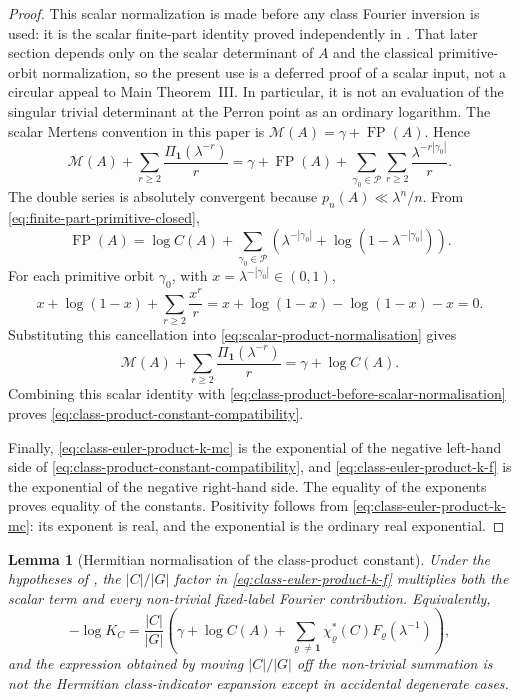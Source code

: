 \documentclass[11pt,a4paper]{amsart}
\theoremstyle{plain}
\newtheorem{lemma}[theorem]{Lemma}
\theoremstyle{definition}
\theoremstyle{remark}
\DeclareMathOperator{\FP}{FP}
\newcommand{\cP}{\mathcal P}
\begin{document}
\begin{proof}
  This scalar normalization is made before any class Fourier inversion is
  used: it is the scalar finite-part identity proved independently in
  .  That later section depends only on the scalar
  determinant of \(A\) and the classical primitive-orbit normalization, so the
  present use is a deferred proof of a scalar input, not a circular appeal to
  Main Theorem~III.  In particular, it is not an evaluation of the singular
  trivial determinant at the Perron point as an ordinary logarithm.
  The scalar Mertens convention in this paper is
  \(\mathcal M(A)=\gamma+\FP(A)\). Hence
  \begin{equation}\label{eq:scalar-product-normalisation}
    \mathcal M(A)+\sum_{r\ge2}\frac{\Pi_{\mathbf1}(\lambda^{-r})}{r}
    =
    \gamma+\FP(A)+
    \sum_{\gamma_0\in\cP}\sum_{r\ge2}
      \frac{\lambda^{-r|\gamma_0|}}{r}.
  \end{equation}
  The double series is absolutely convergent because
  \(p_n(A)\ll\lambda^n/n\). From
  \eqref{eq:finite-part-primitive-closed},
  \[
    \FP(A)
    =
    \log C(A)+
    \sum_{\gamma_0\in\cP}
      \left(
        \lambda^{-|\gamma_0|}
        +\log(1-\lambda^{-|\gamma_0|})
      \right).
  \]
  For each primitive orbit \(\gamma_0\), with
  \(x=\lambda^{-|\gamma_0|}\in(0,1)\),
  \[
    x+\log(1-x)+\sum_{r\ge2}\frac{x^r}{r}
    =x+\log(1-x)-\log(1-x)-x=0.
  \]
  Substituting this cancellation into
  \eqref{eq:scalar-product-normalisation} gives
  \[
    \mathcal M(A)+\sum_{r\ge2}\frac{\Pi_{\mathbf1}(\lambda^{-r})}{r}
    =\gamma+\log C(A).
  \]
  Combining this scalar identity with
  \eqref{eq:class-product-before-scalar-normalisation} proves
  \eqref{eq:class-product-constant-compatibility}.

  Finally, \eqref{eq:class-euler-product-k-mc} is the exponential of the
  negative left-hand side of
  \eqref{eq:class-product-constant-compatibility}, and
  \eqref{eq:class-euler-product-k-f} is the exponential of the negative
  right-hand side. The equality of the exponents proves equality of the
  constants. Positivity follows from
  \eqref{eq:class-euler-product-k-mc}: its exponent is real, and the
  exponential is the ordinary real exponential.
\end{proof}

\begin{lemma}[Hermitian normalisation of the class-product constant]
  \label{lem:class-product-hermitian-normalisation}
  Under the hypotheses of , the
  \(|C|/|G|\) factor in \eqref{eq:class-euler-product-k-f} multiplies both
  the scalar term and every non-trivial fixed-label Fourier contribution.
  Equivalently,
  \begin{equation}\label{eq:class-product-normalisation-identity}
    -\log K_C
    =
    \frac{|C|}{|G|}
    \left(
      \gamma+\log C(A)
      +\sum_{\varrho\neq\mathbf1}
        \chi_\varrho^\ast(C)F_\varrho(\lambda^{-1})
    \right),
  \end{equation}
  and the expression obtained by moving \(|C|/|G|\) off the non-trivial
  summation is not the Hermitian class-indicator expansion except in
  accidental degenerate cases.
\end{lemma}
\end{document}
